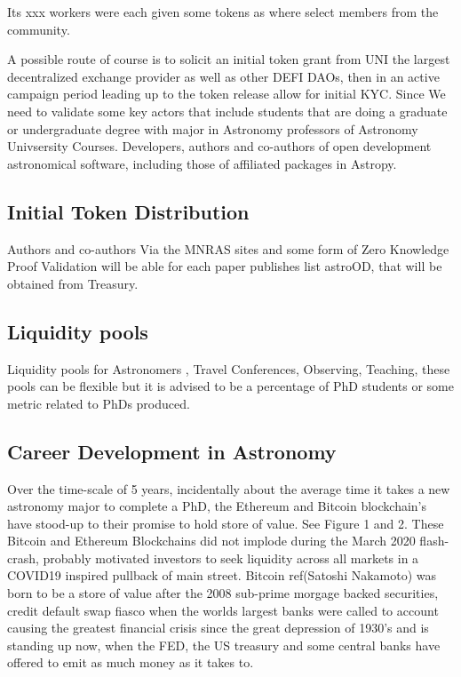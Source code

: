 \documentclass[final,5p,times,twocolumn,authoryear]{elsarticle}
\begin{document}
Its xxx workers were each given some tokens as where select members from the community. 

A possible route of course is to solicit an initial token grant from UNI the largest decentralized exchange provider as well as other DEFI DAOs, then in an active campaign period leading up to the token release allow for initial KYC. Since We need to validate some key actors that include students that are doing a graduate or undergraduate degree with major in Astronomy professors of Astronomy Univsersity Courses. Developers, authors and co-authors of open development astronomical software, including those of affiliated packages in Astropy. 

\subsection{Initial Token Distribution}

Authors and co-authors Via the MNRAS sites and some form of Zero Knowledge Proof Validation will be able for each paper publishes list astroOD, that will be obtained from Treasury.

\subsection{Liquidity pools}

Liquidity pools for Astronomers , Travel Conferences, Observing, Teaching, these pools can be flexible but it is advised to be a percentage of PhD  students or some metric related to PhDs produced. 

\subsection{Career Development in Astronomy}

Over the time-scale of 5 years, incidentally about the average time it takes a new astronomy major to complete a PhD, the Ethereum and Bitcoin blockchain's have stood-up to their promise to hold store of value. See Figure 1 and 2. These Bitcoin and Ethereum Blockchains did not implode during the March 2020 flash-crash, probably motivated investors to seek liquidity across all markets in a COVID19 inspired pullback of main street.  Bitcoin ref(Satoshi Nakamoto) was born to be a store of value after the 2008 sub-prime morgage backed securities, credit default swap fiasco when the worlds largest banks were called to account causing the greatest financial crisis since the great depression of 1930's and is standing up now, when the FED, the US treasury and some central banks have offered to emit as much money as it takes to.
 
\end{document}
